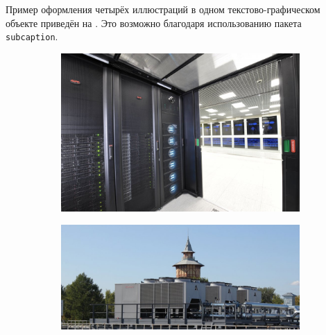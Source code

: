 Пример оформления четырёх иллюстраций в одном текстово-графическом объекте приведён на . Это возможно благодаря использованию пакета \verb|subcaption|.

\begin{figure}[ht]
	\begin{subfigure}[t]{\dimexpr.5\linewidth-1.3em\relax}
		\centering
		\includegraphics[width=.95\linewidth,valign=t]{my_folder/images/spbpu_sc_system}
	\end{subfigure}
\hfill %
	\begin{subfigure}[t]{\dimexpr.5\linewidth-1.3em\relax}
		\centering
		\includegraphics[width=.95\linewidth,valign=t]{my_folder/images/spbpu_sc_refr}
	\end{subfigure}
\\[20pt]
\begin{subfigure}[t]{\dimexpr.5\linewidth-1.3em\relax}
	\centering

\end{subfigure}
\end{figure}
